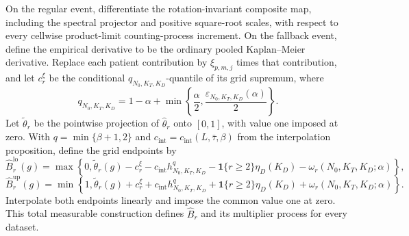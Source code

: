 On the regular event, differentiate the rotation-invariant composite map, including the spectral projector and positive square-root scales, with respect to every cellwise product-limit counting-process increment.  On the fallback event, define the empirical derivative to be the ordinary pooled Kaplan--Meier derivative.  Replace each patient contribution by \(\xi_{p,m,j}\) times that contribution, and let \(c_r^\xi\) be the conditional \(q_{N_0,K_T,K_D}\)-quantile of its grid supremum, where
\[
 q_{N_0,K_T,K_D}=1-\alpha+
 \min\left\{\frac{\alpha}{2},\frac{\varepsilon_{N_0,K_T,K_D}(\alpha)}{2}\right\}.
\]
Let \(\widetilde\theta_r\) be the pointwise projection of \(\widehat\theta_r\) onto \([0,1]\), with value one imposed at zero.  With \(q=\min\{\beta+1,2\}\) and \(c_{\mathrm{int}}=c_{\mathrm{int}}(L,\bar\tau,\beta)\) from the interpolation proposition, define the grid endpoints by
\[
 \widehat B_r^{\mathrm{lo}}(g)=\max\!\left\{0,\widetilde\theta_r(g)-c_r^\xi-c_{\mathrm{int}}h_{N_0,K_T,K_D}^{q}-\mathbf 1\{r\ge2\}\eta_D(K_D)-\omega_r(N_0,K_T,K_D;\alpha)\right\},
\]
\[
 \widehat B_r^{\mathrm{up}}(g)=\min\!\left\{1,\widetilde\theta_r(g)+c_r^\xi+c_{\mathrm{int}}h_{N_0,K_T,K_D}^{q}+\mathbf 1\{r\ge2\}\eta_D(K_D)+\omega_r(N_0,K_T,K_D;\alpha)\right\}.
\]
Interpolate both endpoints linearly and impose the common value one at zero.  This total measurable construction defines \(\widehat B_r\) and its multiplier process for every dataset.